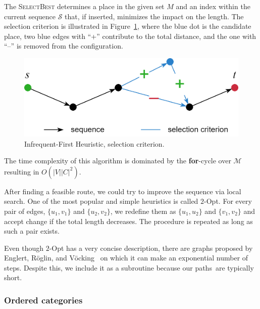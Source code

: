 The \textsc{SelectBest} determines a place in the given set $M$ and an index within the current sequence $\mathcal{S}$ that, if inserted, minimizes the impact on the length. The selection criterion is illustrated in Figure~\ref{fig:if-heuristic}, where the blue dot is the candidate place, two blue edges with ``+'' contribute to the total distance, and the one with ``--'' is removed from the configuration.

\begin{figure}[!h]
\centering
\includegraphics[width=0.65\linewidth]{img/design/if-heuristic.png}
\caption{Infrequent-First Heuristic, selection criterion.}
\label{fig:if-heuristic}
\end{figure}

The time complexity of this algorithm is dominated by the \textbf{for}-cycle over $\mathcal{M}$ resulting in $O(\lvert V \rvert \lvert C \rvert^{2})$.


After finding a feasible route, we could try to improve the sequence via local search. One of the most popular and simple heuristics is called $2$-Opt. For every pair of edges, $\{ u_{1}, v_{1} \}$ and $\{ u_{2}, v_{2} \}$, we redefine them as $\{ u_{1}, u_{2} \}$ and $\{ v_{1}, v_{2} \}$ and accept change if the total length decreases. The procedure is repeated as long as such a pair exists.

Even though $2$-Opt has a very concise description, there are graphs proposed by Englert, R\"{o}glin, and V\"{o}cking~\cite{englert14} on which it can make an exponential number of steps. Despite this, we include it as a subroutine because our paths~are typically short.

\subsubsection*{Ordered categories}

